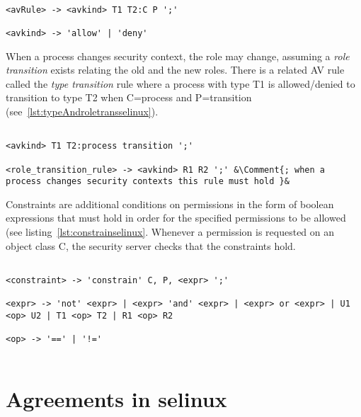 \lstset{language=selinux}
\begin{lstlisting}[frame=single, caption={AV Rule},label={lst:avruleselinux}]

<avRule> -> <avkind> T1 T2:C P ';'

<avkind> -> 'allow' | 'deny'
\end{lstlisting}

When a process changes security context, the role may change, assuming a \emph{role transition} exists relating the old and the new roles. There is a related AV rule called the \emph{type transition} rule where a process with type T1 is allowed/denied to transition to type T2 when C=process and P=transition (see~\ref{lst:typeAndroletransselinux}).

\lstset{mathescape, language=AST} 
\begin{lstlisting}[frame=single, caption={Type Transition and Role-Allow Rules},label={lst:typeAndroletransselinux}]

<avkind> T1 T2:process transition ';'

<role_transition_rule> -> <avkind> R1 R2 ';' &\Comment{; when a process changes security contexts this rule must hold }&

\end{lstlisting}

Constraints are additional conditions on permissions in the form of boolean expressions that must hold in order for the specified permissions to be allowed (see listing~\ref{lst:constrainselinux}. Whenever a permission is requested on an object class C, the security server checks that the constraints hold.

\lstset{language=selinux}
\begin{minipage}[c]{0.95\textwidth}
\begin{lstlisting}[frame=single, caption={Constrain Rule},label={lst:constrainselinux}]

<constraint> -> 'constrain' C, P, <expr> ';'

<expr> -> 'not' <expr> | <expr> 'and' <expr> | <expr> or <expr> | U1 <op> U2 | T1 <op> T2 | R1 <op> R2

<op> -> '==' | '!='
 
\end{lstlisting}
\end{minipage}

\section{Agreements in \ac{selinux}}

